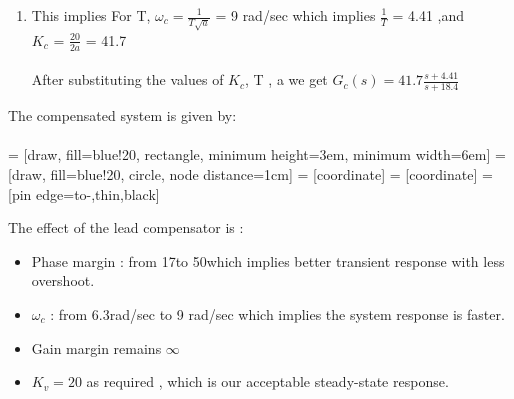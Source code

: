 \begin{enumerate}[label=\thesection.\arabic*.,ref=\thesection.\theenumi]
\begin{enumerate}
\item This implies For T,
$\omega_c =\frac{1}{T\sqrt{a}}$ = 9 rad/sec which implies $\frac{1}{T}$ = 4.41 ,and \\
 
 $K_c$ = $\frac{20}{2a}$ = 41.7\\ \\

  After substituting the values of $K_c$, T , a we get  $G_c(s) = 41.7 \frac{s+4.41}{s + 18.4}$  
 
\end{enumerate}  

The compensated system is given by: \\ \\


 = [draw, fill=blue!20, rectangle, 
    minimum height=3em, minimum width=6em]
 = [draw, fill=blue!20, circle, node distance=1cm]
 = [coordinate]
 = [coordinate]
 = [pin edge={to-,thin,black}]


The effect of the lead compensator is :

\begin{itemize}
  \item  Phase margin : from 17\degree to 50\degree which implies better transient response
with less overshoot.
  \item $\omega_c$ : from 6.3rad/sec to 9 rad/sec which implies the system response is
faster.
\item Gain margin remains $\infty$
\item $K_v = 20$ as required , which is our acceptable steady-state response.
\end{itemize}


                        
  
\end{enumerate}
